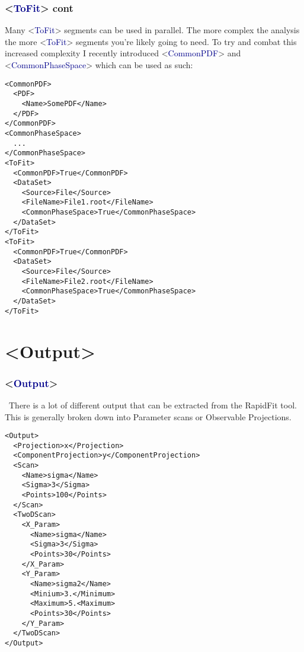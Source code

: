 \documentclass{beamer}
\begin{document}
\begin{frame}[fragile]
\frametitle{<\textcolor{darkblue}{ToFit}> cont}
\scriptsize Many <\textcolor{darkblue}{ToFit}> segments can be used in parallel.
The more complex the analysis the more <\textcolor{darkblue}{ToFit}> segments you're likely going to need.\newline
To try and combat this increased complexity I recently introduced <\textcolor{darkblue}{CommonPDF}> and <\textcolor{darkblue}{CommonPhaseSpace}> which can be used as such:

\tiny
\begin{lstlisting}[tabsize=8]
<CommonPDF>
  <PDF>
    <Name>SomePDF</Name>
  </PDF>
</CommonPDF>
<CommonPhaseSpace>
  ...
</CommonPhaseSpace>
<ToFit>
  <CommonPDF>True</CommonPDF>
  <DataSet>
    <Source>File</Source>
    <FileName>File1.root</FileName>
    <CommonPhaseSpace>True</CommonPhaseSpace>
  </DataSet>
</ToFit>
<ToFit>
  <CommonPDF>True</CommonPDF>
  <DataSet>
    <Source>File</Source>
    <FileName>File2.root</FileName>
    <CommonPhaseSpace>True</CommonPhaseSpace>
  </DataSet>
</ToFit>
\end{lstlisting}
\end{frame}

\section{<Output>}
\begin{frame}[fragile]
\frametitle{<\textcolor{darkblue}{Output}>}
\scriptsize~There is a lot of different output that can be extracted from the RapidFit tool.\newline
This is generally broken down into Parameter scans or Observable Projections.
\tiny
\begin{lstlisting}[tabsize=8]
<Output>
  <Projection>x</Projection>
  <ComponentProjection>y</ComponentProjection>
  <Scan>
    <Name>sigma</Name>
    <Sigma>3</Sigma>
    <Points>100</Points>
  </Scan>
  <TwoDScan>
    <X_Param>
      <Name>sigma</Name>
      <Sigma>3</Sigma>
      <Points>30</Points>
    </X_Param>
    <Y_Param>
      <Name>sigma2</Name>
      <Minium>3.</Minimum>
      <Maximum>5.<Maximum>
      <Points>30</Points>
    </Y_Param>
  </TwoDScan>
</Output>
\end{lstlisting}
\end{frame}
\end{document}
